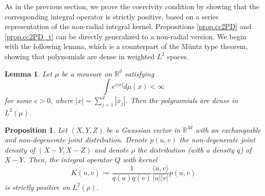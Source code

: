 \documentclass[]{elsarticle}
\def\R{\mathbb{R}}
\newcommand{\innerp}[2]{\langle #1,#2 \rangle}
\newtheorem{lemma}[theorem]{Lemma}
\newtheorem{proposition}[theorem]{Proposition}
\numberwithin{equation}{section}
\numberwithin{theorem}{section}
\begin{document}
As in the previous section, we prove the coercivity condition by showing that the corresponding integral operator is strictly positive, based on a series representation of the non-radial integral kernel. Propositions \ref{prop.cc2PD} and \ref{prop.cc2PD_t} can be directly generalized to a non-radial version. We begin with the following lemma, which is a counterpart of the M\"untz type theorem, showing that polynomials are dense in weighted $L^2$ spaces. 
\begin{lemma}\label{poly} {\rm \cite[Lemma 1.1]{bs92}} Let $\mu$ be a measure on $\mathbb{R}^d$ satisfying
\[\int e^{c|x|}d\mu(x)<\infty\]
for some $c>0$, where $|x|=\sum_{j=1}^d|x_j|$. Then the polynomials are dense in $L^2(\mu)$.
\end{lemma}
\begin{proposition}\label{Gaussian}
Let $(X, Y, Z)  $ be a Gaussian vector in $ \R^{3d}$ with an exchangeable and non-degenerate joint distribution.  Denote $ p(u,v)$  the non-degenerate joint density of $(X-Y, X-Z)$ and denote $\rho$ the distribution (with a density $q$) of $X-Y$.
 Then, the integral operator $Q$ with kernel
  \begin{equation} \label{kernelK_gauss2}
K(u,v) := \frac{1}{q(u)q(v)} \frac{\innerp{u}{v}}{|u||v|} p(u,v)
 \end{equation}
is strictly positive on $L^2(\rho)$.
\end{proposition}
\end{document}

